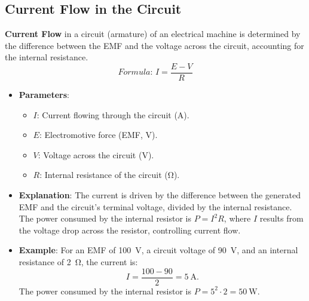 \documentclass[12pt]{article}
\newcommand{\concept}[1]{\textbf{#1}}
\newcommand{\formula}[1]{\textit{Formula: }#1}
\begin{document}
\subsection{Current Flow in the Circuit}
\concept{Current Flow} in a circuit (armature) of an electrical machine is determined by the difference between the EMF and the voltage across the circuit, accounting for the internal resistance.
\[
\formula{I = \frac{E - V}{R}}
\]
\begin{itemize}
    \item \textbf{Parameters}:
        \begin{itemize}
            \item \(I\): Current flowing through the circuit (\si{\ampere}).
            \item \(E\): Electromotive force (EMF, \si{\volt}).
            \item \(V\): Voltage across the circuit (\si{\volt}).
            \item \(R\): Internal resistance of the circuit (\si{\ohm}).
        \end{itemize}
    \item \textbf{Explanation}: The current is driven by the difference between the generated EMF and the circuit’s terminal voltage, divided by the internal resistance. The power consumed by the internal resistor is \(P = I^2 R\), where \(I\) results from the voltage drop across the resistor, controlling current flow.
    \item \textbf{Example}: For an EMF of \SI{100}{\volt}, a circuit voltage of \SI{90}{\volt}, and an internal resistance of \SI{2}{\ohm}, the current is:
        \[
        I = \frac{100 - 90}{2} = \SI{5}{\ampere}.
        \]
        The power consumed by the internal resistor is \(P = 5^2 \cdot 2 = \SI{50}{\watt}\).
\end{itemize}
\end{document}
